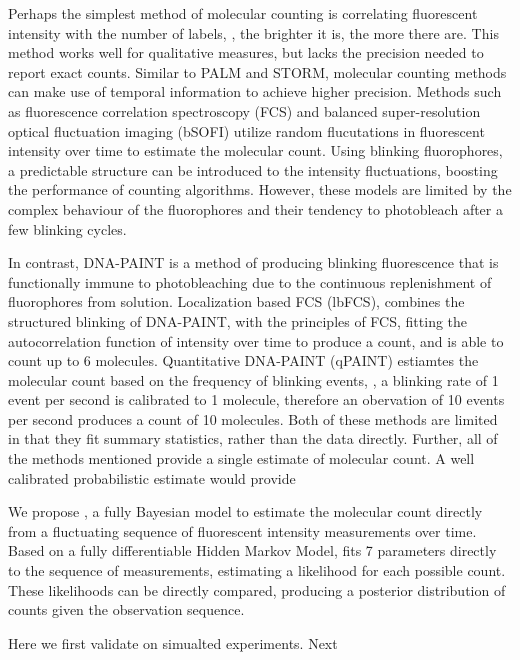 Perhaps the simplest method of molecular counting is correlating fluorescent
    intensity with the number of labels, \ie, the brighter it is, the more there are.
    This method works well for qualitative measures, but lacks the precision needed 
    to report exact counts.
    Similar to PALM and STORM, molecular counting methods can make use of temporal information
    to achieve higher precision.
    Methods such as fluorescence correlation spectroscopy (FCS) and 
    balanced super-resolution optical fluctuation imaging (bSOFI)
    utilize random flucutations in fluorescent intensity over time to estimate the molecular count.
    Using blinking fluorophores, a predictable structure can be introduced 
    to the intensity fluctuations, boosting the performance of counting algorithms.
    However, these models are limited by the complex behaviour of the fluorophores and their
    tendency to photobleach after a few blinking cycles.


In contrast, DNA-PAINT is a method of producing blinking fluorescence that is functionally
    immune to photobleaching due to the continuous replenishment of fluorophores from solution.
    Localization based FCS (lbFCS), combines the structured blinking of DNA-PAINT, with the 
    principles of FCS, fitting the autocorrelation function of intensity over time to produce a count,
    and is able to count up to 6 molecules.
    Quantitative DNA-PAINT (qPAINT) estiamtes the molecular count based on the frequency of blinking events, \ie, 
    a blinking rate of 1 event per second is calibrated to 1 molecule, therefore an obervation of 10 events per second
    produces a count of 10 molecules.
    Both of these methods are limited in that they fit summary statistics,
    rather than the data directly. 
    Further, all of the methods mentioned provide a single estimate of molecular count.
    A well calibrated probabilistic estimate would provide 
    
We propose \ours, a fully Bayesian model to estimate the molecular 
  count directly from a fluctuating sequence of fluorescent intensity measurements over time.
  Based on a fully differentiable Hidden Markov Model, \ours fits 7 parameters
  directly to the sequence of measurements, estimating a likelihood for each possible count. 
  These likelihoods can be directly compared, producing a posterior distribution of counts 
  given the observation sequence. 

Here we first validate \ours on simualted experiments. Next
